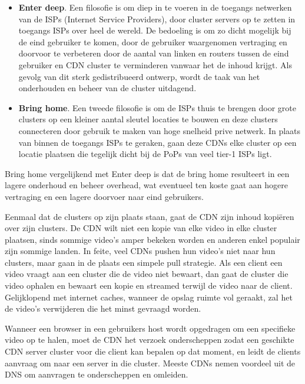 \begin{itemize}
   \item \textbf{Enter deep}. Een filosofie is om diep in te voeren in de toegangs netwerken van de ISPs (Internet Service Providers), door cluster servers op te zetten in toegangs ISPs over heel de wereld. De bedoeling is om zo dicht mogelijk bij de eind gebruiker te komen, door de gebruiker waargenomen vertraging en doorvoor te verbeteren door de aantal van linken en routers tussen de eind gebruiker en CDN cluster te verminderen vanwaar het de inhoud krijgt. Als gevolg van dit sterk gedistribueerd ontwerp, wordt de taak van het onderhouden en beheer van de cluster uitdagend.
 \item \textbf{Bring home}. Een tweede filosofie is om de ISPs thuis te brengen door grote clusters op een kleiner aantal sleutel locaties te bouwen en deze clusters connecteren door gebruik te maken van hoge snelheid prive netwerk. In plaats van binnen de toegangs ISPs te geraken, gaan deze CDNs  elke cluster op een locatie plaatsen die tegelijk dicht bij de PoPs van veel tier-1 ISPs ligt.
\end{itemize}

\noindent Bring home vergelijkend met Enter deep is dat de bring home resulteert in een lagere onderhoud en beheer overhead, wat eventueel ten koste gaat aan hogere vertraging en een lagere doorvoer naar eind gebruikers.

\newpage

\noindent Eenmaal dat de clusters op zijn plaats staan, gaat de CDN zijn inhoud kopiëren over zijn clusters. De CDN wilt niet een kopie van elke video in elke cluster plaatsen, sinds sommige video’s amper bekeken worden en anderen enkel populair zijn sommige landen. In feite, veel CDNs pushen hun video’s niet naar hun clusters, maar gaan in de plaats een simpele pull strategie. Als een client een video vraagt aan een cluster die de video niet bewaart, dan gaat de cluster die video ophalen en bewaart een kopie en streamed terwijl de video naar de client. Gelijklopend met internet caches, wanneer de opslag ruimte vol geraakt, zal het de video’s verwijderen die het minst gevraagd worden.


Wanneer  een browser in een gebruikers host wordt opgedragen om een specifieke video op te halen, moet de CDN het verzoek onderscheppen zodat een geschikte CDN server cluster voor die client kan bepalen op dat moment, en leidt de clients aanvraag om naar een server in die cluster.
Meeste CDNs nemen voordeel uit de DNS om aanvragen te onderscheppen en omleiden.

